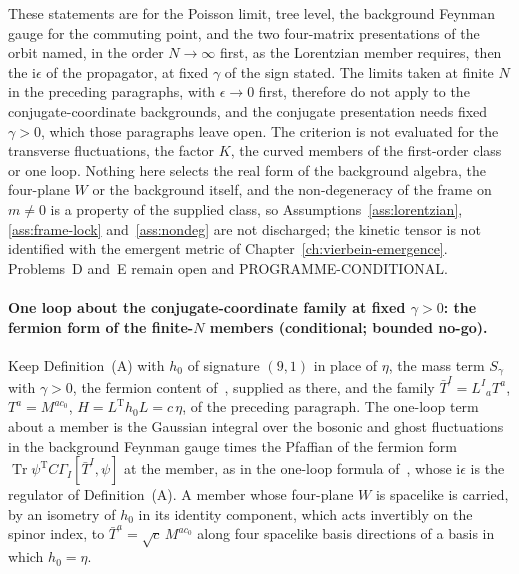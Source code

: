 These statements are for the Poisson limit, tree level, the background Feynman gauge for the commuting point, and the two four-matrix presentations of the orbit named, in the order \(N\to\infty\) first, as the Lorentzian member requires, then the \(\mathrm i\epsilon\) of the propagator, at fixed \(\gamma\) of the sign stated. The limits taken at finite \(N\) in the preceding paragraphs, with \(\epsilon\to0\) first, therefore do not apply to the conjugate-coordinate backgrounds, and the conjugate presentation needs fixed \(\gamma>0\), which those paragraphs leave open. The criterion is not evaluated for the transverse fluctuations, the factor \(K\), the curved members of the first-order class or one loop. Nothing here selects the real form of the background algebra, the four-plane \(W\) or the background itself, and the non-degeneracy of the frame on \(m\neq0\) is a property of the supplied class, so Assumptions~\ref{ass:lorentzian}, \ref{ass:frame-lock} and~\ref{ass:nondeg} are not discharged; the kinetic tensor is not identified with the emergent metric of Chapter~\ref{ch:vierbein-emergence}. Problems~D and~E remain open and PROGRAMME-CONDITIONAL.

\paragraph{One loop about the conjugate-coordinate family at fixed \(\gamma>0\): the fermion form of the finite-\(N\) members (conditional; bounded no-go).}
Keep Definition~(A) with \(h_0\) of signature \((9,1)\) in place of \(\eta\), the mass term \(S_\gamma\) with \(\gamma>0\), the fermion content of~\cite{IKKT1997}, supplied as there, and the family \(\bar T^I=L^I{}_aT^a\), \(T^a=M^{ac_0}\), \(H=L^{\mathrm T}h_0L=c\,\eta\), of the preceding paragraph. The one-loop term about a member is the Gaussian integral over the bosonic and ghost fluctuations in the background Feynman gauge times the Pfaffian of the fermion form \(\operatorname{Tr}\psi^{\mathrm T}C\Gamma_I[\bar T^I,\psi]\) at the member, as in the one-loop formula of~\cite{Steinacker2023}, whose \(\mathrm i\epsilon\) is the regulator of Definition~(A). A member whose four-plane \(W\) is spacelike is carried, by an isometry of \(h_0\) in its identity component, which acts invertibly on the spinor index, to \(\bar T^a=\sqrt c\,M^{ac_0}\) along four spacelike basis directions of a basis in which \(h_0=\eta\).

